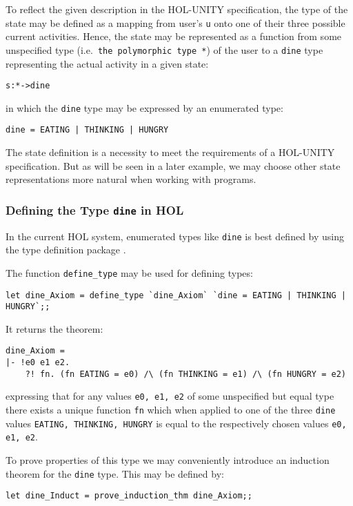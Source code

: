 To reflect the given description in the HOL-UNITY specification, the type of
the state may be defined as a mapping from user's {\tt u} onto one of their
three possible current activities.  Hence, the state may be represented as a
function from some unspecified type (i.e.\ {\tt the polymorphic type *}) of the
user to a {\tt dine} type representing the actual activity in a given state:

\hspace{6mm} {\tt s:*->dine}

in which the {\tt dine} type may be expressed by an enumerated type:

\hspace{6mm} {\tt dine = EATING | THINKING | HUNGRY}

The state definition is a necessity to meet the requirements of a HOL-UNITY
specification.  But as will be seen in a later example, we may choose
other state representations more natural when working with programs.


\subsubsection{Defining the Type {\tt dine} in HOL}

In the current HOL system, enumerated types like {\tt dine} is best defined
by using the type definition package \cite{Melham88}.

The function {\tt define\_type} may be used for defining types:
{\footnotesize 
\begin{verbatim}
let dine_Axiom = define_type `dine_Axiom` `dine = EATING | THINKING | HUNGRY`;;
\end{verbatim}
}

It returns the theorem:
{\footnotesize 
\begin{verbatim}
dine_Axiom = 
|- !e0 e1 e2.
    ?! fn. (fn EATING = e0) /\ (fn THINKING = e1) /\ (fn HUNGRY = e2)
\end{verbatim}
}
expressing that for any values {\tt e0, e1, e2} of some unspecified but equal
type there exists a unique function {\tt fn} which when applied to one of the
three {\tt dine} values {\tt EATING, THINKING, HUNGRY} is equal to the
respectively chosen values {\tt e0, e1, e2}.

To prove properties of this type we may conveniently introduce an induction 
theorem for the {\tt dine} type.  This may be defined by:
{\footnotesize 
\begin{verbatim}
let dine_Induct = prove_induction_thm dine_Axiom;;
\end{verbatim}
}

